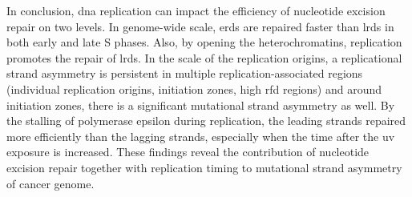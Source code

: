 In conclusion, \gls{dna} replication can impact the efficiency of nucleotide excision repair on two levels. In genome-wide scale, \gls{erd}s are repaired faster than \gls{lrd}s in both early and late S phases. Also, by opening the heterochromatins, replication promotes the repair of \gls{lrd}s. In the scale of the replication origins, a replicational strand asymmetry is persistent in multiple replication-associated regions (individual replication origins, initiation zones, high \gls{rfd} regions) and around initiation zones, there is a significant mutational strand asymmetry as well. By the stalling of polymerase \gls{epsilon} during replication, the leading strands repaired more efficiently than the lagging strands, especially when the time after the \gls{uv} exposure is increased. These findings reveal the contribution of nucleotide excision repair together with replication timing to mutational strand asymmetry of cancer genome.

